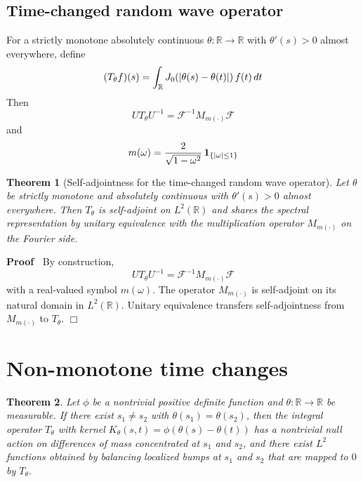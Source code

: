 \documentclass{article}
\newcommand{\cdummy}{\cdot}
\newenvironment{proof}{\noindent\textbf{Proof\ }}{\hspace*{\fill}$\Box$\medskip}
{\theorembodyfont{\rmfamily}\newtheorem{example}{Example}}
\newtheorem{theorem}{Theorem}
\begin{document}
\subsection{Time-changed random wave operator}

For a strictly monotone absolutely continuous $\theta : \mathbb{R} \to
\mathbb{R}$ with $\theta' (s) > 0$ almost everywhere, define
\begin{equation}
  (T_{\theta} f) (s) = \int_{\mathbb{R}} J_0 (| \theta (s) - \theta (t) |) 
  \hspace{0.17em} f (t)  \hspace{0.17em} dt
\end{equation}
Then
\begin{equation}
  UT_{\theta} U^{- 1} =\mathcal{F}^{- 1} M_{m (\cdummy)} \mathcal{F}
\end{equation}
and
\begin{equation}
  m (\omega) = \frac{2}{\sqrt{1 - \omega^2}}  \hspace{0.17em} \textbf{1}_{\{|
  \omega | \le 1\}}
\end{equation}
\begin{theorem}
  [Self-adjointness for the time-changed random wave operator] Let $\theta$ be
  strictly monotone and absolutely continuous with $\theta' (s) > 0$ almost
  everywhere. Then $T_{\theta}$ is self-adjoint on $L^2 (\mathbb{R})$ and
  shares the spectral representation by unitary equivalence with the
  multiplication operator $M_{m (\cdummy)}$ on the Fourier side.
\end{theorem}

\begin{proof}
  By construction,
  \begin{equation}
    UT_{\theta} U^{- 1} =\mathcal{F}^{- 1} M_{m (\cdummy)} \mathcal{F}
  \end{equation}
  with a real-valued symbol $m (\omega)$. The operator $M_{m (\cdummy)}$ is
  self-adjoint on its natural domain in $L^2 (\mathbb{R})$. Unitary
  equivalence transfers self-adjointness from $M_{m (\cdummy)}$ to
  $T_{\theta}$.
\end{proof}

\section{Non-monotone time changes}

\begin{theorem}
  Let $\phi$ be a nontrivial positive definite function and $\theta :
  \mathbb{R} \to \mathbb{R}$ be measurable. If there exist $s_1 \neq s_2$ with
  $\theta (s_1) = \theta (s_2)$, then the integral operator $T_{\theta}$ with
  kernel $K_{\theta} (s, t) = \phi (\theta (s) - \theta (t))$ has a nontrivial
  null action on differences of mass concentrated at $s_1$ and $s_2$, and
  there exist $L^2$ functions obtained by balancing localized bumps at $s_1$
  and $s_2$ that are mapped to $0$ by $T_{\theta}$.
\end{theorem}
\end{document}
